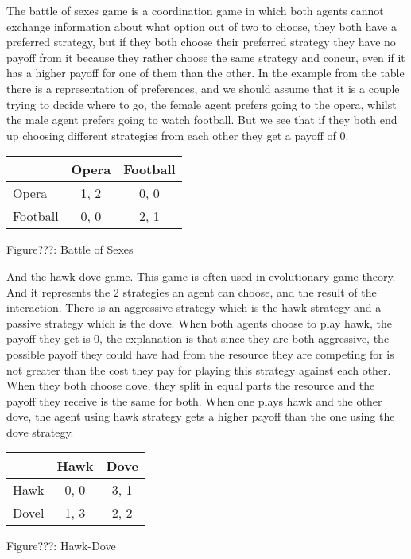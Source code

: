 \documentclass{article}
\begin{document}
The battle of sexes game is a coordination game in which both agents cannot exchange information about what option out of two to choose, they both have a preferred strategy, but if they both choose their preferred strategy they have no payoff from it because they rather choose the same strategy and concur,  even if it has a higher payoff for one of them than the other. In the example from the table there is a representation of preferences, and we should assume that it is a couple trying to decide where to go, the female agent prefers going to the opera, whilst the male agent prefers going to watch football. But we see that if they both end up choosing different strategies from each other they get a payoff of 0. 
\begin{center}
\begin{tabular}{|l|c|c|}
\hline
 & Opera & Football \\ 
\hline
Opera & 1, 2 & 0, 0\\
\hline
 Football & 0, 0 & 2, 1\\
\hline
\end{tabular}
\end{center}
\begin{center}
	Figure???: Battle of Sexes
\end{center}

And the hawk-dove game. This game is often used in  evolutionary game theory. And it represents the 2 strategies an agent can choose,  and the result of the interaction. There is an aggressive strategy which is the hawk strategy and a passive strategy which is the dove. When both agents choose to play hawk, the payoff they get is 0, the explanation is that since they are both aggressive, the possible payoff they could have had from the resource they are competing for is not greater than the cost they pay for playing this strategy against each other. When they both choose dove, they split in equal parts the resource and the payoff they receive is the same for both. When one plays hawk and the other dove, the agent using hawk strategy gets a higher payoff than the one using the dove strategy.    
\begin{center}
\begin{tabular}{|l|c|c|}
\hline
 & Hawk & Dove \\ 
\hline
Hawk & 0, 0 & 3, 1\\
\hline
 Dovel & 1, 3 & 2, 2\\
\hline
\end{tabular}
\end{center}
\begin{center}
	Figure???: Hawk-Dove
\end{center}
\end{document}
